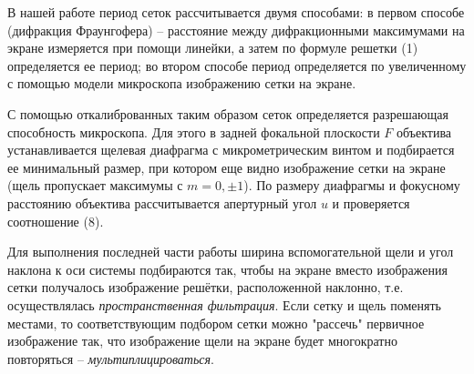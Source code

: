 \documentclass[14pt]{article}
\begin{document}
В нашей работе период сеток рассчитывается двумя способами: в первом способе (дифракция Фраунгофера) --
расстояние между дифракционными максимумами на экране измеряется при помощи линейки, а затем по формуле
решетки (1) определяется ее период; во втором способе период определяется по увеличенному с помощью модели
микроскопа изображению сетки на экране.

С помощью откалиброванных таким образом сеток определяется разрешающая способность микроскопа.
Для этого в задней фокальной плоскости $F$ объектива устанавливается щелевая диафрагма с микрометрическим
винтом и подбирается ее минимальный размер, при котором еще видно изображение сетки на экране (щель пропускает
максимумы с $m = 0, \pm 1$). По размеру диафрагмы и фокусному расстоянию объектива рассчитывается апертурный угол
$u$ и проверяется соотношение (8).

Для выполнения последней части работы ширина вспомогательной щели и угол наклона к оси системы подбираются так,
чтобы на экране вместо изображения сетки получалось изображение решётки, расположенной наклонно, т.е.
осуществлялась \textsl{пространственная фильтрация}. Если сетку
и щель поменять местами, то соответствующим подбором сетки можно "рассечь" первичное изображение так, что изображение щели
на экране будет многократно повторяться -- \textsl{мультиплицироваться}.
\end{document}
